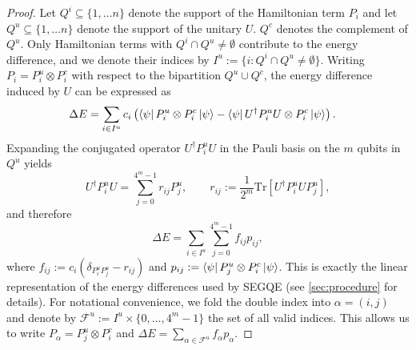 \begin{proof}
    Let $Q^i\subseteq\{1,\ldots n\}$ denote the support of the Hamiltonian term $P_i$ and let $Q^u\subseteq\{1,\ldots n\}$ denote the support of the unitary $U$. $Q^c$ denotes the complement of $Q^u$. Only Hamiltonian terms with $Q^i\cap Q^u\neq\emptyset$ contribute to the energy difference, and we denote their indices by $I^u:=\{i:Q^i\cap Q^u\neq\emptyset\}$. Writing $P_i=P_i^u\otimes P_i^c$ with respect to the bipartition $Q^u\cup Q^c$, the energy difference induced by $U$ can be expressed as
    \begin{align}
        \Delta E&= \sum_{i\in I^u}c_i\left(\bra{\psi}P^u_i\otimes P_i^c\ket{\psi}-\bra{\psi}U^\dagger P^u_i U\otimes P_i^c\ket{\psi} \right).
    \end{align}
    Expanding the conjugated operator $U^\dagger P_i^u U$ in the Pauli basis on the $m$ qubits in $Q^u$ yields
    \begin{equation}
        U^\dagger P^u_i U=\sum_{j=0}^{4^m-1}r_{ij}P_j^u,\qquad r_{ij}:=\frac{1}{2^m}\mathrm{Tr}\left[U^\dagger P^u_iUP_j^u\right],
    \end{equation}
    and therefore
    \begin{equation}
        \label{eq:energy_difference_app}
        \Delta E=\sum_{i\in I^u}\sum^{4^m-1}_{j=0}f_{ij}p_{ij},
    \end{equation}
    where $f_{ij}:= c_i(\delta_{P^u_iP_j^u} - r_{ij})$ and $p_{ij} := \bra{\psi} P_j^u \otimes P_i^c \ket{\psi}$. This is exactly the linear representation of the energy differences used by SEGQE (see \cref{sec:procedure} for details). For notational convenience, we fold the double index into $\alpha=(i,j)$ and denote by $\mathcal{F}^u:=I^u\times \{0,...,4^m-1\}$ the set of all valid indices. This allows us to write $P_\alpha=P^u_j\otimes P^c_i$ and $\Delta E=\sum_{\alpha\in\mathcal{F}^u} f_\alpha p_\alpha$.
    

\end{proof}

